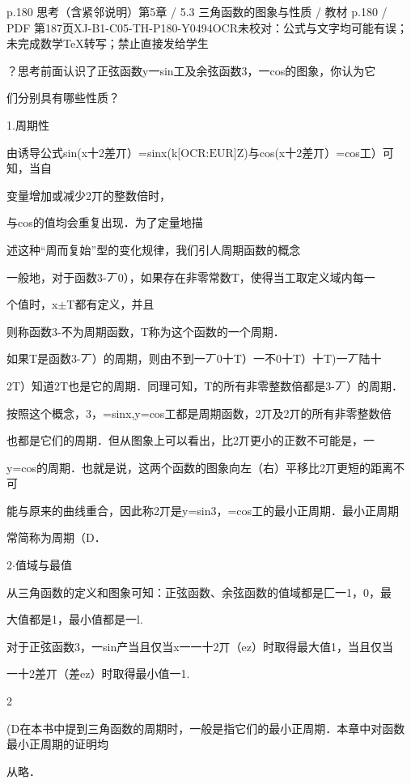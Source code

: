 \begin{bankitem}{p.180 思考（含紧邻说明）}{第5章 / 5.3 三角函数的图象与性质 / 教材 p.180 / PDF 第187页}{XJ-B1-C05-TH-P180-Y0494}{OCR未校对：公式与文字均可能有误；未完成数学TeX转写；禁止直接发给学生}
\begin{ocrdraft}
\par
？思考前面认识了正弦函数y一sin工及余弦函数3，一cos的图象，你认为它
\par
们分别具有哪些性质？
\par
1.周期性
\par
由诱导公式sin(x十2差丌）=sinx(k\ensuremath{\text{[OCR:EUR]}}Z)与cos(x十2差丌）=cos工）可知，当自
\par
变量增加或减少2丌的整数倍时，
\par
与cos的值均会重复出现．为了定量地描
\par
述这种“周而复始”型的变化规律，我们引人周期函数的概念
\par
一般地，对于函数3-丆0），如果存在非零常数T，使得当工取定义域内每一
\par
个值时，x\ensuremath{\pm}T都有定义，并且
\par
则称函数3-不为周期函数，T称为这个函数的一个周期．
\par
如果T是函数3-丆）的周期，则由不到一丆0十T）一不0十T）十T)一丆陆十
\par
2T）知道2T也是它的周期．同理可知，T的所有非零整数倍都是3-丆）的周期．
\par
按照这个概念，3，=sinx,y=cos工都是周期函数，2丌及2丌的所有非零整数倍
\par
也都是它们的周期．但从图象上可以看出，比2丌更小的正数不可能是，一
\par
y=cos的周期．也就是说，这两个函数的图象向左（右）平移比2丌更短的距离不可
\par
能与原来的曲线重合，因此称2丌是y=sin3，=cos工的最小正周期．最小正周期
\par
常简称为周期（D．
\par
2\ensuremath{\cdot}值域与最值
\par
从三角函数的定义和图象可知：正弦函数、余弦函数的值域都是匚一1，0，最
\par
大值都是1，最小值都是一l.
\par
对于正弦函数3，一sin产当且仅当x一一十2丌（ez）时取得最大值1，当且仅当
\par
一十2差丌（差ez）时取得最小值一1.
\par
2
\par
(D在本书中提到三角函数的周期时，一般是指它们的最小正周期．本章中对函数最小正周期的证明均
\par
从略．
\end{ocrdraft}
\end{bankitem}
